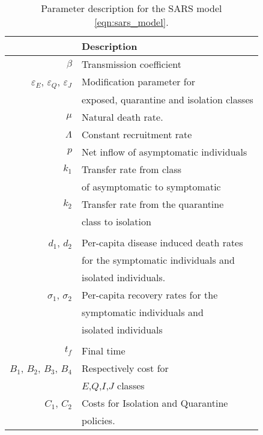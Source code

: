 \begin{table}[H]
    \begin{center}
      \begin{tabular}{@{}rl@{}}
        \toprule
        & \multicolumn{1}{l}{\bf{Description}}
        \\
        \midrule
        $\beta$
          & Transmission coefficient
        \\
        $\varepsilon_E$, 
        $\varepsilon_Q$,
        $\varepsilon_J$
          & Modification parameter for 
          \\
          &  exposed, quarantine and isolation classes 
          \\
        $\mu$
          & Natural death rate.
        \\
        $\Lambda$
          & Constant recruitment rate
        \\
        $p$
          & Net inflow of asymptomatic individuals
        \\
        $k_1$ 
          & Transfer rate from class 
          \\
          & of asymptomatic to symptomatic
          \\
        $k_2$
          & Transfer rate from the quarantine 
          \\ 
          & class to isolation
        \\
        \\
        $d_1$, $d_2$
          & Per-capita disease induced death rates 
          \\
          & for the symptomatic individuals and 
          \\
          & isolated individuals.
        \\
        $\sigma_1$, $\sigma_2$
          & Per-capita recovery rates for the 
          \\
          & symptomatic individuals and 
          \\
          &  isolated individuals
        \\
        \\
        $t_f$
          & Final time 
        \\
        $B_1$, $B_2$, $B_3$, $B_4$
        & Respectively cost for 
        \\
        &
          $E$,$Q$,$I$,$J$ classes
        \\
        $C_1$, $C_2$
        & Costs for Isolation and Quarantine 
        \\
          & policies.
        \\
        \bottomrule
      \end{tabular}
     \caption{Parameter description for the SARS model
     \eqref{eqn:sars_model}.}
     \label{tbl:sars_table_des}
     \end{center}
\end{table}
